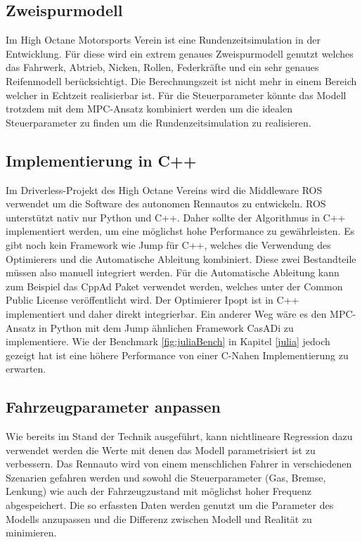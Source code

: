 \documentclass{like}
\begin{document}
\subsection{Zweispurmodell}
Im High Octane Motorsports Verein ist eine Rundenzeitsimulation in der Entwicklung. Für diese wird ein extrem genaues Zweispurmodell genutzt welches das Fahrwerk, Abtrieb, Nicken, Rollen, Federkräfte und ein sehr genaues Reifenmodell berücksichtigt. Die Berechnungszeit ist nicht mehr in einem Bereich welcher in Echtzeit realisierbar ist. Für die Steuerparameter könnte das Modell trotzdem mit dem \ac{MPC}-Ansatz kombiniert werden um die idealen Steuerparameter zu finden um die Rundenzeitsimulation zu realisieren. 

\subsection{Implementierung in C++}
Im Driverless-Projekt des High Octane Vereins wird die Middleware \ac{ROS} verwendet um die Software des autonomen Rennautos zu entwickeln. \ac{ROS} unterstützt nativ nur Python und C++. Daher sollte der Algorithmus in C++ implementiert werden, um eine möglichst hohe Performance zu gewährleisten. 
Es gibt noch kein Framework wie \ac{Jump} für C++, welches die Verwendung des Optimierers und die Automatische Ableitung kombiniert. Diese zwei Bestandteile müssen also manuell integriert werden. Für die Automatische Ableitung kann zum Beispiel das CppAd Paket verwendet werden, welches unter der Common Public License veröffentlicht wird. Der Optimierer \ac{Ipopt} ist in C++ implementiert und daher direkt integrierbar. 
Ein anderer Weg wäre es den \ac{MPC}-Ansatz in Python mit dem \ac{Jump} ähnlichen Framework CasADi zu implementiere. Wie der Benchmark \ref{fig:juliaBench} in Kapitel \ref{julia} jedoch gezeigt hat ist eine höhere Performance von einer C-Nahen Implementierung zu erwarten. 

\subsection{Fahrzeugparameter anpassen}
Wie bereits im Stand der Technik ausgeführt, kann nichtlineare Regression dazu verwendet werden die Werte mit denen das Modell parametrisiert ist zu verbessern. Das Rennauto wird von einem menschlichen Fahrer in verschiedenen Szenarien gefahren werden und sowohl die Steuerparameter (Gas, Bremse, Lenkung) wie auch der Fahrzeugzustand mit möglichst hoher Frequenz abgespeichert. Die so erfassten Daten werden genutzt um die Parameter des Modells anzupassen und die Differenz zwischen Modell und Realität zu minimieren. 


\appendix





%



%


\end{document}
